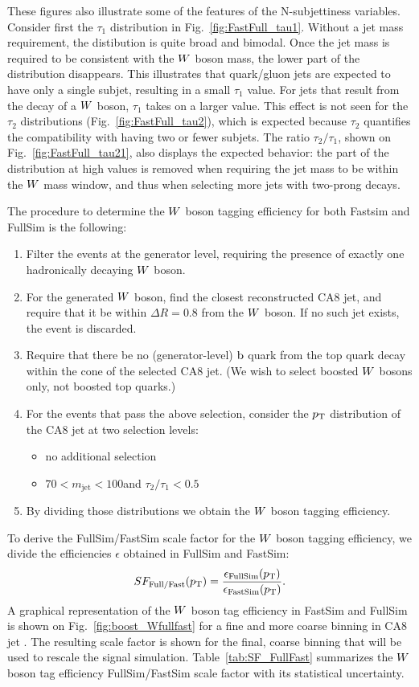 These figures also illustrate some of the features of the N-subjettiness variables.
Consider first the $\tau_1$ distribution in Fig.~\ref{fig:FastFull_tau1}. Without a jet mass
requirement, the distibution is quite broad and bimodal. Once the jet mass is required to
be consistent with the $W$ boson mass, the lower part of the distribution disappears. This
illustrates that quark/gluon jets are expected to have only a single subjet, resulting in a small
$\tau_1$ value. For jets that result from the decay of a $W$ boson, $\tau_1$ takes on a larger
value. 
This effect is not seen for the $\tau_2$ distributions (Fig.~\ref{fig:FastFull_tau2}), which is
expected because $\tau_2$ quantifies the compatibility with having two or fewer subjets. 
The ratio $\tau_2/\tau_1$, shown on Fig.~\ref{fig:FastFull_tau21}, also displays the
expected behavior: the part of the distribution at high values is removed when requiring the jet
mass to be within the $W$ mass window, and thus when selecting more jets with two-prong decays. 

The procedure to determine the $W$ boson tagging efficiency for both Fastsim and FullSim is the
following:
\begin{enumerate}
\item Filter the events at the generator level, requiring the presence of exactly one hadronically
decaying $W$ boson. 
\item For the generated $W$ boson, find the closest reconstructed CA8 jet, and require that it be
within $\Delta R = 0.8$ from the $W$ boson. If no such jet exists, the event is discarded.  
\item Require that there be no (generator-level) $\mathrm{b}$ quark from the top quark decay within the
cone of the selected CA8 jet. (We wish to select boosted $W$ bosons only, not boosted top quarks.)
\item For the events that pass the above selection, consider the $p_{\mathrm{T}}$ distribution of the CA8 jet
at two selection levels:
 \begin{itemize}
   \item no additional selection
   \item $70 < m_\textrm{jet} < 100$\GeV and $\tau_2/\tau_1 < 0.5$
 \end{itemize}
\item By dividing those \pt distributions we obtain the $W$ boson tagging efficiency. 
\end{enumerate}
To derive the FullSim/FastSim scale factor for the $W$ boson tagging efficiency, we divide the
efficiencies $\epsilon$ obtained in FullSim and FastSim:
\begin{equation}
SF_{\textrm{Full/Fast}}(p_{\mathrm{T}}) =
\frac{\epsilon_{\textrm{FullSim}}(p_{\mathrm{T}})}{\epsilon_{\textrm{FastSim}}(p_{\mathrm{T}})}.
\end{equation}
A graphical representation of the $W$ boson tag efficiency in FastSim and FullSim is shown on
Fig.~\ref{fig:boost_Wfullfast} for a fine and more coarse binning in CA8 jet \pt. The resulting
scale factor is shown for the final, coarse binning that will be used to rescale the signal
simulation. 
Table~\ref{tab:SF_FullFast} summarizes the $W$ boson tag efficiency FullSim/FastSim scale factor
with its
statistical uncertainty.

